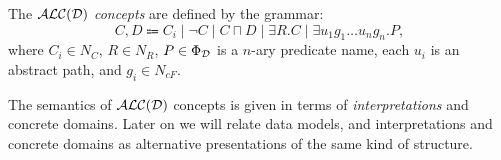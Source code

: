   

\begin{definition}[Language] \label{def:alcd-syntax}
    The $\mathcal{ALC(D)}$ \emph{concepts} are defined by the grammar:
    \[
        C, D \Coloneqq
        C_i \mid
        \lnot C \mid
        C \sqcap D \mid
        \exists R.C \mid
        \exists u_1g_1 \dots u_ng_n.P,
    \]
    where $C_i\in N_C$, $R\in N_R$, $P \in \Phi_{\mathcal{D}}$ is a $n$-ary predicate name, each $u_i$ is an abstract path, and $g_i \in N_{\mathit{cF}}$.
\end{definition}

The semantics of $\mathcal{ALC(D)}$ concepts is given in terms of \emph{interpretations} and concrete domains. Later on we will relate data models, and interpretations and concrete domains as alternative presentations of the same kind of structure.

